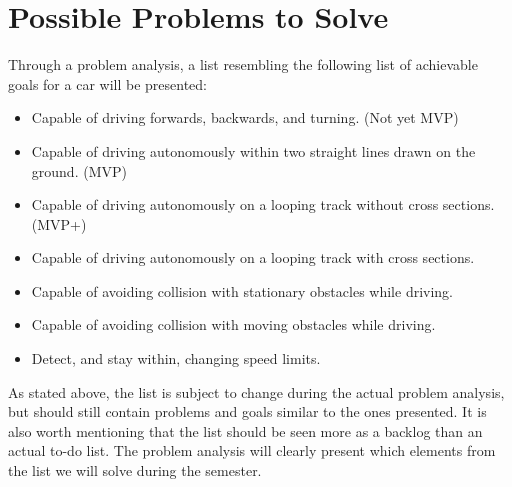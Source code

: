 \section*{Possible Problems to Solve}
Through a problem analysis, a list resembling the following list of achievable goals for a car will be presented:
\begin{itemize}
	\item Capable of driving forwards, backwards, and turning. (Not yet MVP)
	\item Capable of driving autonomously within two straight lines drawn on the ground. (MVP)
	\item Capable of driving autonomously on a looping track without cross sections. (MVP+)
	\item Capable of driving autonomously on a looping track with cross sections.
	\item Capable of avoiding collision with stationary obstacles while driving.
	\item Capable of avoiding collision with moving obstacles while driving.
	\item Detect, and stay within, changing speed limits.
\end{itemize}
As stated above, the list is subject to change during the actual problem analysis, but should still contain problems and goals similar to the ones presented.
It is also worth mentioning that the list should be seen more as a backlog than an actual to-do list.
The problem analysis will clearly present which elements from the list we will solve during the semester.


\begingroup
	\raggedright
  \printbibliography
\endgroup
\cleardoublepage


